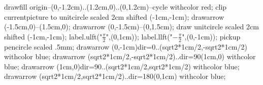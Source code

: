\startMPpage
	drawfill origin--(0,-1.2cm)..(1.2cm,0)..(0,1.2cm)--cycle withcolor red;
	clip currentpicture to unitcircle scaled 2cm shifted (-1cm,-1cm);
	drawarrow (-1.5cm,0)--(1.5cm,0);
	drawarrow (0,-1.5cm)--(0,1.5cm);
	draw unitcircle scaled 2cm shifted (-1cm,-1cm);
	label.ulft("$\frac\pi2$",(0,1cm));
	label.llft("$-\frac\pi2$",(0,-1cm));
	pickup pencircle scaled .5mm;
	drawarrow (0,-1cm){dir=0}..(sqrt2*1cm/2,-sqrt2*1cm/2) withcolor blue;
	drawarrow (sqrt2*1cm/2,-sqrt2*1cm/2)..{dir=90}(1cm,0) withcolor blue;
	drawarrow (1cm,0){dir=90}..(sqrt2*1cm/2,sqrt2*1cm/2) withcolor blue;
	drawarrow (sqrt2*1cm/2,sqrt2*1cm/2)..{dir=180}(0,1cm) withcolor blue;
\stopMPpage

